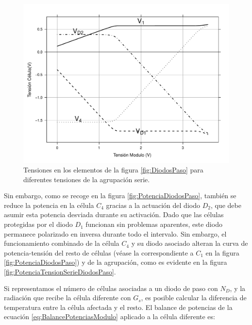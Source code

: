 \begin{figure}
\begin{centering}
\includegraphics[scale=0.5]{../figs/TensionesCelulasDiodos_DiodoPaso}
\end{centering}

\caption{Tensiones en los elementos de la figura \ref{fig:DiodosPaso} para
diferentes tensiones de la agrupación serie.\label{fig:TensionesDiodosPaso}}

\end{figure}

Sin embargo, como se recoge en la figura \ref{fig:PotenciaDiodosPaso},
también se reduce la potencia en la célula $C_{4}$ gracias a la actuación
del diodo $D_{2}$, que debe asumir esta potencia desviada durante
su activación. Dado que las células protegidas por el diodo $D_{1}$
funcionan sin problemas aparentes, este diodo permanece polarizado
en inversa durante todo el intervalo. Sin embargo, el funcionamiento
combinado de la célula $C_{4}$ y su diodo asociado alteran la curva
de potencia-tensión del resto de células (véase la correspondiente
a $C_{1}$ en la figura \ref{fig:PotenciaDiodosPaso}) y de la agrupación,
como es evidente en la figura \ref{fig:PotenciaTensionSerieDiodosPaso}. 

Si representamos el número de células asociadas a un diodo de paso
con $N_{D}$,
y la radiación que recibe la célula diferente con $G_{s}$, es posible
calcular la diferencia de temperatura entre la célula afectada y el
resto. El balance de potencias de la ecuación \ref{eq:BalancePotenciasModulo}
aplicado a la célula diferente es:

